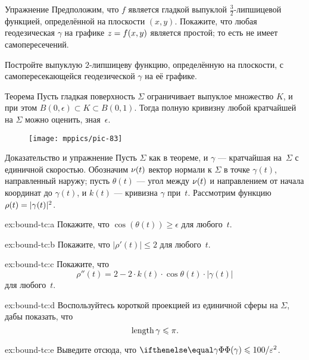 \begin{thm}{Упражнение}\label{ex:ruf-bound-mountain}
Предположим, что $f$ является гладкой выпуклой $\tfrac32$-липшицевой функцией, определённой на плоскости $(x,y)$.
Покажите, что любая геодезическая $\gamma$ на графике $z\z=f(x,y)$ является простой; то есть не имеет самопересечений.

{\sloppy

Постройте выпуклую $2$-липшицеву функцию, определённую на плоскости,
с самопересекающейся геодезической $\gamma$ на её графике.

}

\end{thm}



\begin{thm}{Теорема}\label{thm:tc-of-mingeod}
Пусть гладкая поверхность $\Sigma$ ограничивает выпуклое множество $K$, и при этом $B(0,\epsilon)\subset K\subset B(0,1)$.
Тогда полную кривизну любой кратчайшей на $\Sigma$ можно оценить, зная~$\epsilon$.
\end{thm}

{

\begin{wrapfigure}{r}{48 mm}
\vskip4mm
\centering
\texttt{[image: mppics/pic-83]}
\vskip-0mm
\end{wrapfigure}

\begin{thm}{Доказательство и упражнение}\label{ex:bound-tc}
Пусть $\Sigma$ как в теореме, и $\gamma$ --- кратчайшая на~$\Sigma$ с единичной скоростью.
Обозначим $\nu(t)$ вектор нормали к $\Sigma$ в точке $\gamma(t)$, направленный наружу;
пусть $\theta(t)$ --- угол между $\nu(t)$ и направлением от начала координат до $\gamma(t)$,
и 
$k(t)$ --- кривизна $\gamma$ при~$t$.
Рассмотрим функцию $\rho(t)\z=|\gamma(t)|^2$.


\begin{subthm}{ex:bound-tc:a}
Покажите, что $\cos(\theta(t))\ge \epsilon$ для любого~$t$.
\end{subthm}

\begin{subthm}{ex:bound-tc:b}
Покажите, что $|\rho'(t)|\le 2$ для любого~$t$.
\end{subthm}

\begin{subthm}{ex:bound-tc:c}
Покажите, что
\[\rho''(t)=2-2\cdot k(t)\cdot \cos \theta(t)\cdot |\gamma(t)|\]
для любого~$t$.
\end{subthm}

\begin{subthm}{ex:bound-tc:d}
Воспользуйтесь короткой проекцией из единичной сферы на $\Sigma$, дабы показать, что
\[\mathop{\rm length}\nolimits \gamma\leqslant \pi.\]
\end{subthm}

\begin{subthm}{ex:bound-tc:e}
Выведите отсюда, что $\tc\gamma\le 100/\epsilon^2$.
\end{subthm}

\end{thm}

}

